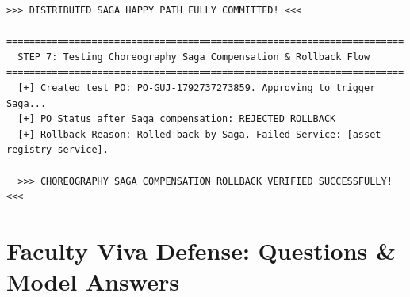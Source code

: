 \documentclass[11pt,a4paper]{article}
\begin{document}
\begin{lstlisting}[caption=Live Test Execution Log from test\_saga\_flow.py]
  >>> DISTRIBUTED SAGA HAPPY PATH FULLY COMMITTED! <<<

======================================================================
  STEP 7: Testing Choreography Saga Compensation & Rollback Flow
======================================================================
  [+] Created test PO: PO-GUJ-1792737273859. Approving to trigger Saga...
  [+] PO Status after Saga compensation: REJECTED_ROLLBACK
  [+] Rollback Reason: Rolled back by Saga. Failed Service: [asset-registry-service].

  >>> CHOREOGRAPHY SAGA COMPENSATION ROLLBACK VERIFIED SUCCESSFULLY! <<<
\end{lstlisting}

\newpage
\section{Faculty Viva Defense: Questions \& Model Answers}
\end{document}
